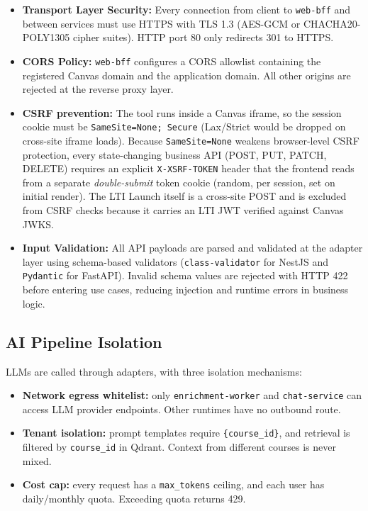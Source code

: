 \begin{itemize}
    \item \textbf{Transport Layer Security:} Every connection from client
          to \texttt{web-bff} and between services must use HTTPS with TLS
          1.3 (AES-GCM or CHACHA20-POLY1305 cipher suites). HTTP port 80
          only redirects 301 to HTTPS.
    \item \textbf{CORS Policy:} \texttt{web-bff} configures a CORS
          allowlist containing the registered Canvas domain and the
          application domain. All other origins are rejected at the reverse
          proxy layer.
    \item \textbf{CSRF prevention:} The tool runs inside a Canvas
          iframe, so the session cookie must be
          \texttt{SameSite=None; Secure} (Lax/Strict would be dropped on
          cross-site iframe loads). Because \texttt{SameSite=None}
          weakens browser-level CSRF protection, every state-changing
          business API (POST, PUT, PATCH, DELETE) requires an explicit
          \texttt{X-XSRF-TOKEN} header that the frontend reads from a
          separate \emph{double-submit} token cookie (random, per
          session, set on initial render). The LTI Launch itself is a
          cross-site POST and is excluded from CSRF checks because it
          carries an LTI JWT verified against Canvas JWKS.
    \item \textbf{Input Validation:} All API payloads are parsed and
          validated at the adapter layer using schema-based validators
          (\texttt{class-validator} for NestJS and \texttt{Pydantic} for
          FastAPI). Invalid schema values are rejected with HTTP 422
          before entering use cases, reducing injection and runtime errors
          in business logic.
\end{itemize}

\subsection{AI Pipeline Isolation}

LLMs are called through adapters, with three isolation mechanisms:

\begin{itemize}
    \item \textbf{Network egress whitelist:} only
          \texttt{enrichment-worker} and \texttt{chat-service} can access
          LLM provider endpoints. Other runtimes have no outbound route.
    \item \textbf{Tenant isolation:} prompt templates require
          \texttt{\{course\_id\}}, and retrieval is filtered by
          \texttt{course\_id} in Qdrant. Context from different courses is
          never mixed.
    \item \textbf{Cost cap:} every request has a \texttt{max\_tokens}
          ceiling, and each user has daily/monthly quota. Exceeding quota
          returns 429.
\end{itemize}

